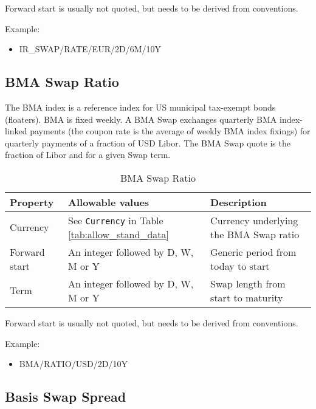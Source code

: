 Forward start is usually not quoted, but needs to be derived from conventions. 

\medskip
Example:
\begin{itemize}
\item {IR\_SWAP/RATE/EUR/2D/6M/10Y}
\end{itemize}

\subsection{BMA Swap Ratio}

The BMA index is a reference index for US municipal tax-exempt bonds (floaters). BMA is fixed weekly. A BMA Swap exchanges quarterly BMA index-linked payments (the coupon rate is the average of weekly BMA index fixings) for quarterly payments of a fraction of USD Libor. The BMA Swap quote is the fraction of Libor and for a given Swap term. 

\begin{table}[H]
\centering
\begin{supertabular}{|p{3cm}|p{3.5cm}|p{7cm}|}
\hline
{\bf Property} & {\bf Allowable values} & {\bf Description} \\
\hline
Currency & See \lstinline!Currency! in Table \ref{tab:allow_stand_data}& Currency underlying the BMA Swap ratio \\ \hline
Forward start & An integer followed by D, W, M or Y  & Generic period from today to start\\ \hline
Term & An integer followed by D, W, M or Y  & Swap length from start to maturity\\
\hline
\end{supertabular}
  \caption{BMA Swap Ratio}
  \label{tab:bmasratio_quote}
\end{table}
Forward start is usually not quoted, but needs to be derived from conventions. 

\medskip
Example: 
\begin{itemize}
\item {BMA/RATIO/USD/2D/10Y}
\end{itemize}

\subsection{Basis Swap Spread}

